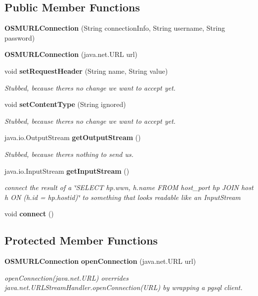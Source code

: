 \subsection*{Public Member Functions}
\begin{DoxyCompactItemize}
\item 
{\bf O\+S\+M\+U\+R\+L\+Connection} (String connection\+Info, String username, String password)
\item 
{\bf O\+S\+M\+U\+R\+L\+Connection} (java.\+net.\+U\+R\+L url)
\item 
void {\bf set\+Request\+Header} (String name, String value)
\begin{DoxyCompactList}\small\item\em Stubbed, because there\textquotesingle{}s no change we want to accept yet. \end{DoxyCompactList}\item 
void {\bf set\+Content\+Type} (String ignored)
\begin{DoxyCompactList}\small\item\em Stubbed, because there\textquotesingle{}s no change we want to accept yet. \end{DoxyCompactList}\item 
java.\+io.\+Output\+Stream {\bf get\+Output\+Stream} ()
\begin{DoxyCompactList}\small\item\em Stubbed, because there\textquotesingle{}s nothing to send us. \end{DoxyCompactList}\item 
java.\+io.\+Input\+Stream {\bf get\+Input\+Stream} ()
\begin{DoxyCompactList}\small\item\em connect the result of a \char`\"{}\+S\+E\+L\+E\+C\+T hp.\+wwn, h.\+name F\+R\+O\+M host\+\_\+port hp J\+O\+I\+N host h O\+N (h.\+id = hp.\+hostid)\char`\"{} to something that looks readable like an Input\+Stream \end{DoxyCompactList}\item 
void {\bf connect} ()
\end{DoxyCompactItemize}
\subsection*{Protected Member Functions}
\begin{DoxyCompactItemize}
\item 
{\bf O\+S\+M\+U\+R\+L\+Connection} {\bf open\+Connection} (java.\+net.\+U\+R\+L url)
\begin{DoxyCompactList}\small\item\em open\+Connection(java.\+net.\+U\+R\+L) overrides java.\+net.\+U\+R\+L\+Stream\+Handler.\+open\+Connection(\+U\+R\+L) by wrapping a pgsql client. \end{DoxyCompactList}\end{DoxyCompactItemize}
